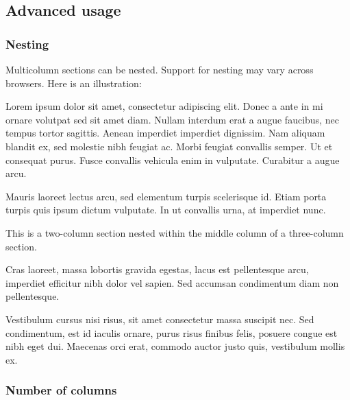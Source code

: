 \documentclass[
]{article}
\begin{document}
\hypertarget{advanced-usage}{%
\subsection{Advanced usage}\label{advanced-usage}}

\hypertarget{nesting}{%
\subsubsection{Nesting}\label{nesting}}

Multicolumn sections can be nested. Support for nesting may vary across
browsers. Here is an illustration:

{\begin{multicols}{3}

Lorem ipsum dolor sit amet, consectetur adipiscing elit. Donec a ante in
mi ornare volutpat sed sit amet diam. Nullam interdum erat a augue
faucibus, nec tempus tortor sagittis. Aenean imperdiet imperdiet
dignissim. Nam aliquam blandit ex, sed molestie nibh feugiat ac. Morbi
feugiat convallis semper. Ut et consequat purus. Fusce convallis
vehicula enim in vulputate. Curabitur a augue arcu.

\columnbreak

Mauris laoreet lectus arcu, sed elementum turpis scelerisque id. Etiam
porta turpis quis ipsum dictum vulputate. In ut convallis urna, at
imperdiet nunc.

{\begin{multicols}{2}

This is a two-column section nested within the middle column of a
three-column section.

\end{multicols}
}

Cras laoreet, massa lobortis gravida egestas, lacus est pellentesque
arcu, imperdiet efficitur nibh dolor vel sapien. Sed accumsan
condimentum diam non pellentesque.

\columnbreak

Vestibulum cursus nisi risus, sit amet consectetur massa suscipit nec.
Sed condimentum, est id iaculis ornare, purus risus finibus felis,
posuere congue est nibh eget dui. Maecenas orci erat, commodo auctor
justo quis, vestibulum mollis ex.

\end{multicols}
}

\hypertarget{number-of-columns}{%
\subsubsection{Number of columns}\label{number-of-columns}}
\end{document}
